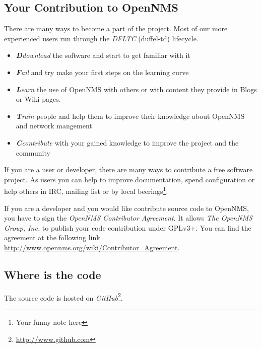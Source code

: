 \subsection*{Your Contribution to OpenNMS}
There are many ways to become a part of the project. Most of our more experienced users run through the \emph{DFLTC} (duffel-td) lifecycle.
\begin{itemize}
  \item \textit{\textbf{D}download} the software and start to get familiar with it 
  \item \textit{\textbf{F}ail} and try make your first steps on the learning curve
  \item \textit{\textbf{L}earn} the use of OpenNMS with others or with content they provide in Blogs or Wiki pages.
  \item \textit{\textbf{T}rain} people and help them to improve their knowledge about OpenNMS and network mangement
  \item \textit{\textbf{C}contribute} with your gained knowledge to improve the project and the community
\end{itemize}
If you are a user or developer, there are many ways to contribute a free software project. As users you can help to improve documentation, spend configuration or help others in IRC, mailing list or by local beerings\footnote{Your funny note here}.

If you are a developer and you would like contribute source code to OpenNMS, you have to sign the \emph{OpenNMS Contributor Agreement}. It allows \textit{The OpenNMS Group, Inc.} to publish your code contribution under GPLv3+. You can find the agreement at the following link \url{http://www.opennms.org/wiki/Contributor_Agreement}. 

\subsection*{Where is the code}
The source code is hosted on \emph{GitHub}\footnote{\url{http://www.github.com}}. 



